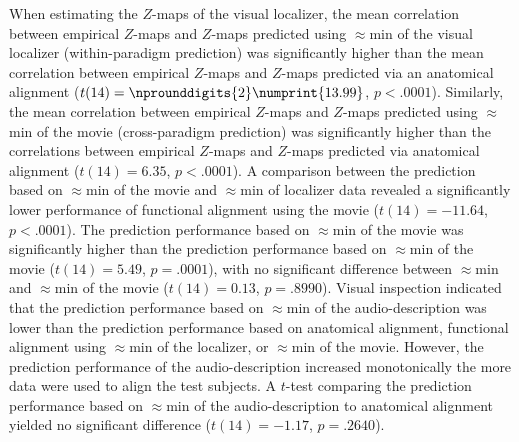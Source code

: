 When estimating the $Z$-maps of the visual localizer, the mean correlation
between empirical $Z$-maps and $Z$-maps predicted using $\approx$\unit[15]{min}
of the visual localizer (within-paradigm prediction) was significantly higher
than the mean correlation between empirical $Z$-maps and $Z$-maps predicted via
an anatomical alignment ($t(14)=\nprounddigits{2}\numprint{13.99}$, $p<.0001$).
Similarly, the mean correlation between empirical $Z$-maps and $Z$-maps
predicted using $\approx$\unit[15]{min} of the movie (cross-paradigm prediction)
was significantly higher than the correlations between empirical $Z$-maps and
$Z$-maps predicted via anatomical alignment ($t(14)=6.35$, $p<.0001$).
%
A comparison between the prediction based on $\approx$\unit[15]{min} of the
movie and $\approx$\unit[15]{min} of localizer data revealed a significantly
lower performance of functional alignment using the movie ($t(14)=-11.64$,
$p<.0001$).
%
The prediction performance based on $\approx$\unit[30]{min} of the movie was
significantly higher than the prediction performance based on
$\approx$\unit[15]{min} of the movie ($t(14)=5.49$, $p=.0001$), with no
significant difference between $\approx$\unit[45]{min} and
$\approx$\unit[30]{min} of the movie ($t(14)=0.13$, $p=.8990$).
Visual inspection indicated that the prediction performance based on
$\approx$\unit[15]{min} of the audio-description was lower than the prediction
performance based on anatomical alignment, functional alignment using
$\approx$\unit[15]{min} of the localizer, or $\approx$\unit[15]{min} of the
movie.
%
However, the prediction performance of the audio-description increased
monotonically the more data were used to align the test subjects.
%
A $t$-test comparing the prediction performance based on
$\approx$\unit[120]{min} of the audio-description to anatomical alignment
yielded no significant difference ($t(14)=-1.17$, $p=.2640$).

